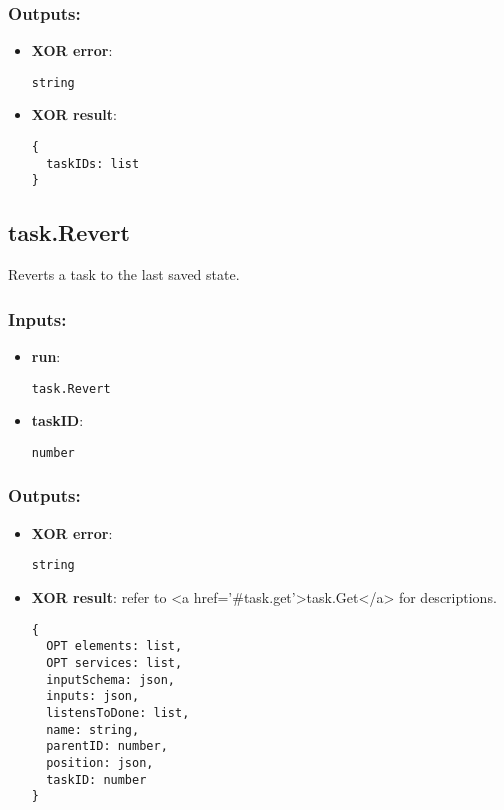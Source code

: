 \subsubsection*{Outputs:}
\begin{itemize}
  \small
    \item \textbf{XOR error}: 
\begin{lstlisting}
string
\end{lstlisting}
    \item \textbf{XOR result}: 
\begin{lstlisting}
{
  taskIDs: list
}
\end{lstlisting}
  \end{itemize}

\subsection{task.Revert}
\label{ch:builtinservices:task.Revert}
Reverts a task to the last saved state.
\subsubsection*{Inputs:}
\begin{itemize}
  \small
    \item \textbf{run}: 
\begin{lstlisting}
task.Revert
\end{lstlisting}
    \item \textbf{taskID}: 
\begin{lstlisting}
number
\end{lstlisting}
  \end{itemize}
\subsubsection*{Outputs:}
\begin{itemize}
  \small
    \item \textbf{XOR error}: 
\begin{lstlisting}
string
\end{lstlisting}
    \item \textbf{XOR result}: refer to <a href='\#task.get'>task.Get</a> for descriptions.
\begin{lstlisting}
{
  OPT elements: list, 
  OPT services: list, 
  inputSchema: json, 
  inputs: json, 
  listensToDone: list, 
  name: string, 
  parentID: number, 
  position: json, 
  taskID: number
}
\end{lstlisting}
  \end{itemize}


